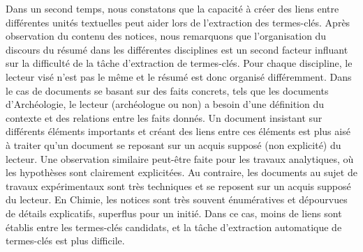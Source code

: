   Dans un second temps, nous constatons que la capacité à créer des liens entre
  différentes unités textuelles peut aider lors de l'extraction des termes-clés.
  Après observation du contenu des notices, nous remarquons que l'organisation
  du discours du résumé dans les différentes disciplines est un second facteur
  influant sur la difficulté de la tâche d'extraction de termes-clés. Pour
  chaque discipline, le lecteur visé n'est pas le même et le résumé est donc
  organisé différemment. Dans le cas de documents se basant sur des faits
  concrets, tels que les documents d'Archéologie, le lecteur (archéologue ou
  non) a besoin d'une définition du contexte et des relations entre les faits
  donnés. Un document insistant sur différents éléments importants et créant des
  liens entre ces éléments est plus aisé à traiter qu'un document se reposant
  sur un acquis supposé (non explicité) du lecteur. Une observation similaire
  peut-être faite pour les travaux analytiques, où les hypothèses sont
  clairement explicitées. Au contraire, les documents au sujet de travaux
  expérimentaux sont très techniques et se reposent sur un acquis supposé du
  lecteur. En Chimie, les notices sont très souvent énumératives et dépourvues
  de détails explicatifs, superflus pour un initié. Dans ce cas, moins de liens
  sont établis entre les termes-clés candidats, et la tâche d'extraction
  automatique de termes-clés est plus difficile.

